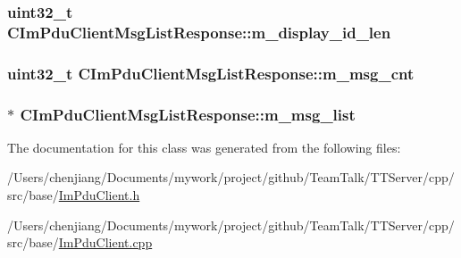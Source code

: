 \subsubsection[{m\+\_\+display\+\_\+id\+\_\+len}]{\setlength{\rightskip}{0pt plus 5cm}uint32\+\_\+t C\+Im\+Pdu\+Client\+Msg\+List\+Response\+::m\+\_\+display\+\_\+id\+\_\+len\hspace{0.3cm}{\ttfamily [private]}}\label{class_c_im_pdu_client_msg_list_response_a4c697c2ff52f15a113d54c0193f6b9c4}
\hypertarget{class_c_im_pdu_client_msg_list_response_a5325748151102dd6873e0395307a038f}{}
\subsubsection[{m\+\_\+msg\+\_\+cnt}]{\setlength{\rightskip}{0pt plus 5cm}uint32\+\_\+t C\+Im\+Pdu\+Client\+Msg\+List\+Response\+::m\+\_\+msg\+\_\+cnt\hspace{0.3cm}{\ttfamily [private]}}\label{class_c_im_pdu_client_msg_list_response_a5325748151102dd6873e0395307a038f}
\hypertarget{class_c_im_pdu_client_msg_list_response_a96f5ba9e9679a2078f90f1f274f726ad}{}
\subsubsection[{m\+\_\+msg\+\_\+list}]{$\ast$ C\+Im\+Pdu\+Client\+Msg\+List\+Response\+::m\+\_\+msg\+\_\+list\hspace{0.3cm}{\ttfamily [private]}}\label{class_c_im_pdu_client_msg_list_response_a96f5ba9e9679a2078f90f1f274f726ad}


The documentation for this class was generated from the following files\+:\begin{DoxyCompactItemize}
\item 
/\+Users/chenjiang/\+Documents/mywork/project/github/\+Team\+Talk/\+T\+T\+Server/cpp/src/base/\hyperlink{_im_pdu_client_8h}{Im\+Pdu\+Client.\+h}\item 
/\+Users/chenjiang/\+Documents/mywork/project/github/\+Team\+Talk/\+T\+T\+Server/cpp/src/base/\hyperlink{_im_pdu_client_8cpp}{Im\+Pdu\+Client.\+cpp}\end{DoxyCompactItemize}
